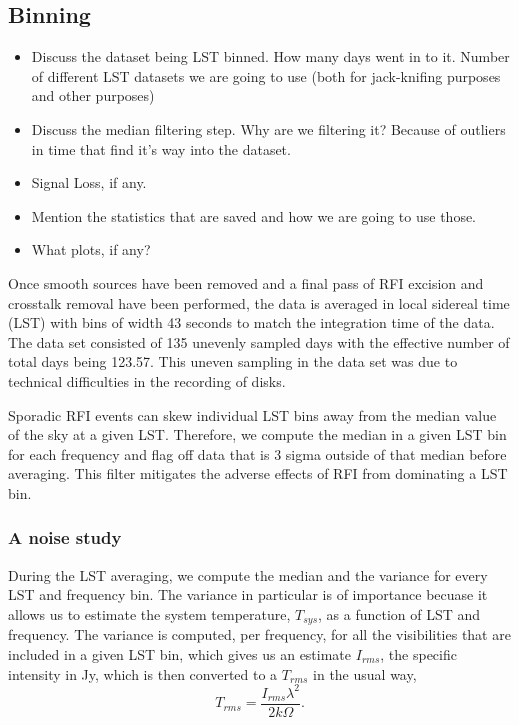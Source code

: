 \documentclass[twocolumn,numberedappendix]{emulateapj}
\begin{document}
\subsection{Binning}
\begin{itemize}
    \item{Discuss the dataset being LST binned. How many days went in to it.
Number of different LST datasets we are going to use (both for jack-knifing
purposes and other purposes)}
    \item{Discuss the median filtering step. Why are we filtering it? Because of
outliers in time that find it's way into the dataset.}
    \item{Signal Loss, if any.}
    \item{Mention the statistics that are saved and how we are going to use those.}
    \item{What plots, if any?}
\end{itemize}

Once smooth sources have been removed and a final pass of RFI excision and
crosstalk removal have been performed, the data is averaged in local sidereal
time (LST) with bins of width 43 seconds to match the integration time of the
data. The data set consisted of 135 unevenly sampled days with the effective
number of total days being 123.57. This uneven sampling in the data set was due
to technical difficulties in the recording of disks.

Sporadic RFI events can skew individual LST bins away from the median value of
the sky at a given LST. Therefore, we compute the median in a given LST bin for
each frequency and flag off data that is 3 sigma outside of that median before
averaging. This filter mitigates the adverse effects of RFI from dominating a
LST bin. 

\subsubsection{A noise study}
During the LST averaging, we compute the median and the variance for every LST
and frequency bin. The variance in particular is of importance becuase it allows
us to estimate the system temperature, $T_{sys}$, as a function of LST and
frequency. The variance is computed, per frequency, for all the visibilities
that are included in a given LST bin, which gives us an estimate ${I_{rms}}$,
the specific intensity in Jy, which is then converted to a $T_{rms}$ in the
usual way, 
\begin{equation}
    T_{rms} = \frac{I_{rms}\lambda^{2}}{2k\Omega}.
\end{equation}
\end{document}
